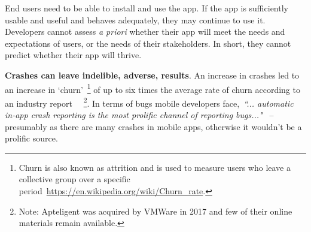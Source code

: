End users need to be able to install and use the app. If the app is sufficiently usable and useful and behaves adequately, they may continue to use it. Developers cannot assess \emph{a priori} whether their app will meet the needs and expectations of users, or the needs of their stakeholders.
In short, they cannot predict whether their app will thrive.


\medskip
\textbf{Crashes can leave indelible, adverse, results}. An increase in crashes led to an increase in `churn'~\footnote{Churn is also known as attrition and is used to measure users who leave a collective group over a specific period~\url{https://en.wikipedia.org/wiki/Churn_rate}.} of up to six times the average rate of churn according to an industry report ~\citep{levy2016_crash_and_churn_report, levy2017_the_crash_and_burn_report_findings}~\footnote{Note: Apteligent was acquired by VMWare in 2017 and few of their online materials remain available.}. %
In terms of bugs mobile developers face,~\emph{``... automatic in-app crash reporting is the most prolific channel of reporting bugs..."}~\citep{alsubaihin2019app_store_effects_on_software_engineering} %
-- presumably as there are many crashes in mobile apps, otherwise it wouldn't be a prolific source. 

